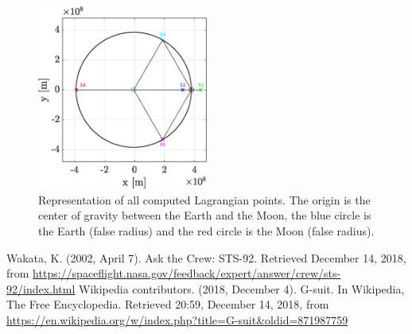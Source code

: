 \documentclass[a4paper,12pt,twoside]{article}
\begin{document}
\begin{figure}[h]
  \centering
  \includegraphics[width=0.5\textwidth]{graphs/ex6b_allLPoints.eps}
  \caption{Representation of all computed Lagrangian points. The origin is the center of gravity between the Earth and the Moon, the blue circle is the Earth (false radius) and the red circle is the Moon (false radius).}
  \label{fig:6b_allLPoints}
\end{figure}



\begin{thebibliography}{99}
   Wakata, K. (2002, April 7). Ask the Crew: STS-92. Retrieved December 14, 2018, from \url{https://spaceflight.nasa.gov/feedback/expert/answer/crew/sts-92/index.html}
   Wikipedia contributors. (2018, December 4). G-suit. In Wikipedia, The Free Encyclopedia. Retrieved 20:59, December 14, 2018, from \url{https://en.wikipedia.org/w/index.php?title=G-suit&oldid=871987759}
\end{thebibliography}
\end{document}
